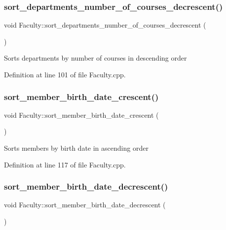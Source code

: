 \subsubsection{\texorpdfstring{sort\+\_\+departments\+\_\+number\+\_\+of\+\_\+courses\+\_\+decrescent()}{sort\_departments\_number\_of\_courses\_decrescent()}}
{\footnotesize\ttfamily void Faculty\+::sort\+\_\+departments\+\_\+number\+\_\+of\+\_\+courses\+\_\+decrescent (\begin{DoxyParamCaption}{ }\end{DoxyParamCaption})}

Sorts departments by number of courses in descending order 

Definition at line 101 of file Faculty.\+cpp.

\mbox{\label{classFaculty_a524f8320d93979695e345f9701c87dd1}} 
\subsubsection{\texorpdfstring{sort\+\_\+member\+\_\+birth\+\_\+date\+\_\+crescent()}{sort\_member\_birth\_date\_crescent()}}
{\footnotesize\ttfamily void Faculty\+::sort\+\_\+member\+\_\+birth\+\_\+date\+\_\+crescent (\begin{DoxyParamCaption}{ }\end{DoxyParamCaption})}

Sorts members by birth date in ascending order 

Definition at line 117 of file Faculty.\+cpp.

\mbox{\label{classFaculty_aa2d7fd660dda947c882c0b02bbdbdc40}} 
\subsubsection{\texorpdfstring{sort\+\_\+member\+\_\+birth\+\_\+date\+\_\+decrescent()}{sort\_member\_birth\_date\_decrescent()}}
{\footnotesize\ttfamily void Faculty\+::sort\+\_\+member\+\_\+birth\+\_\+date\+\_\+decrescent (\begin{DoxyParamCaption}{ }\end{DoxyParamCaption})}

